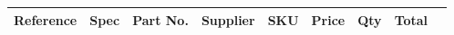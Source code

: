 \documentclass{article}
\begin{document}


\begin{center}
    \begin{longtable}{| p{3.8cm} | l | l | l | l | l | r | r | r |}
    \hline
	\multicolumn{1}{|l|}{\textbf{Reference}} & \multicolumn{1}{l|}{\textbf{Spec}} & \multicolumn{1}{l|}{\textbf{Part No.}} & \multicolumn{1}{l|}{\textbf{Supplier}} & \multicolumn{1}{l|}{\textbf{SKU}} & \multicolumn{1}{r|}{\textbf{Price}} & \multicolumn{1}{r|}{\textbf{Qty}} & \multicolumn{1}{r|}{\textbf{Total}} \\ \hline	 
	\endhead
	
    \end{longtable}
\end{center}


\end{document}
